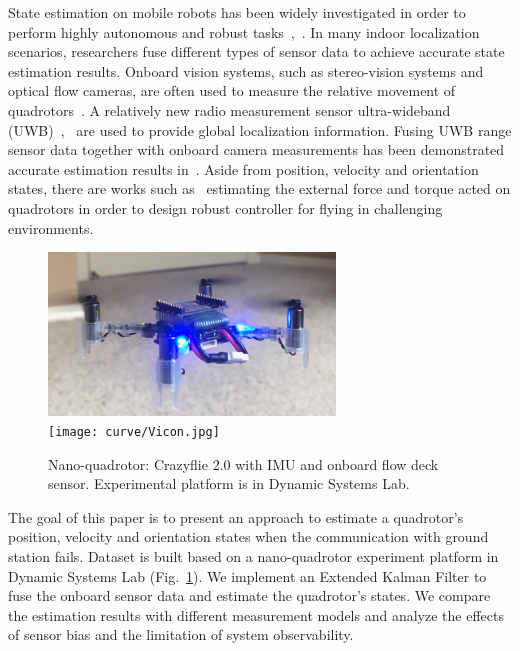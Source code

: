 \documentclass[letterpaper, 10 pt, conference]{ieeeconf}  %
\begin{document}
State estimation on mobile robots has been widely investigated in order to perform highly autonomous and robust tasks~\cite{bloesch2013state},~\cite{mueller2016covariance}. In many indoor localization scenarios, researchers fuse different types of sensor data to achieve accurate state estimation results. Onboard vision systems, such as stereo-vision systems and optical flow cameras, are often used to measure the relative movement of quadrotors~\cite{landry2015planning}. A relatively new radio measurement sensor ultra-wideband (UWB)~\cite{preiss2017crazyswarm},~\cite{ledergerber2017ultra} are used to provide global localization information. Fusing UWB range sensor data together with onboard camera measurements has been demonstrated accurate estimation results in~\cite{Mueller2015FusingUR}. Aside from position, velocity and orientation states, there are works such as~\cite{mckinnon2016unscented} estimating the external force and torque acted on quadrotors in order to design robust controller for flying in challenging environments.

\begin{figure}[t]
\centering
	\includegraphics[width=3in]{curve/Drone.png}   \\
	\texttt{[image: curve/Vicon.jpg]}%
\caption{Nano-quadrotor: Crazyflie 2.0 with IMU and onboard flow deck sensor. Experimental platform is in Dynamic Systems Lab.}
\label{DSL}
\end{figure}

The goal of this paper is to present an approach to estimate a quadrotor's position, velocity and orientation states when the communication with ground station fails. Dataset is built based on a nano-quadrotor experiment platform in Dynamic Systems Lab (Fig.~\ref{DSL}). We implement an Extended Kalman Filter to fuse the onboard sensor data and estimate the quadrotor's states. We compare the estimation results with different measurement models and analyze the effects of sensor bias and the limitation of system observability.  
\end{document}

